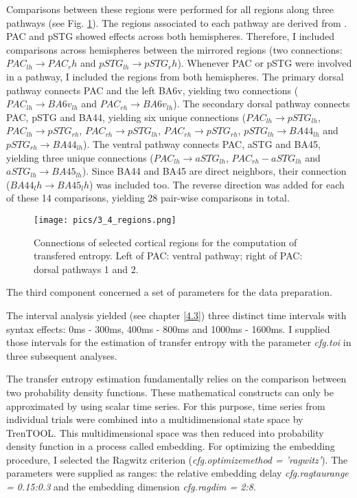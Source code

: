 Comparisons between these regions were performed for all regions along three pathways (see Fig. \ref{3.4.regions}).
The regions associated to each pathway are derived from \cite{1.1.pathways}.
PAC and pSTG showed effects across both hemispheres.
Therefore, I included comparisons across hemispheres between the mirrored regions (two connections: $PAC_{lh} \rightarrow PAC_rh$ and $pSTG_{lh} \rightarrow pSTG_rh$).
Whenever PAC or pSTG were involved in a pathway, I included the regions from both hemispheres.
The primary dorsal pathway connects PAC and the left BA6v, yielding two connections ($PAC_{lh} \rightarrow BA6v_{lh}$ and $PAC_{rh} \rightarrow BA6v_{lh}$).
The secondary dorsal pathway connects PAC, pSTG and BA44, yielding six unique connections ($PAC_{lh} \rightarrow pSTG_{lh}$, $PAC_{lh} \rightarrow pSTG_{rh}$, $PAC_{rh} \rightarrow pSTG_{lh}$, $PAC_{rh} \rightarrow pSTG_{rh}$, $pSTG_{lh} \rightarrow BA44_{lh}$ and $pSTG_{rh} \rightarrow BA44_{lh}$).
The ventral pathway connects PAC, aSTG and BA45, yielding three unique connections ($PAC_{lh} \rightarrow aSTG_{lh}$, $PAC_{rh}-aSTG_{lh}$ and $aSTG_{lh} \rightarrow BA45_{lh}$).
Since BA44 and BA45 are direct neighbors, their connection ($BA44_lh \rightarrow BA45_lh$) was included too.
The reverse direction was added for each of these 14 comparisons, yielding 28 pair-wise comparisons in total.

\begin{figure}[h]
\begin{center}
\vspace{7mm}
\texttt{[image: pics/3\_4\_regions.png]}
\caption{\label{3.4.regions} Connections of selected cortical regions for the computation of transfered entropy. Left of PAC: ventral pathway; right of PAC: dorsal pathways 1 and 2.}
\end{center}
\end{figure}

The third component concerned a set of parameters for the data preparation.

The interval analysis yielded (see chapter \ref{4.3}) three distinct time intervals with syntax effects: 0ms - 300ms, 400ms - 800ms and 1000ms - 1600ms.
I supplied those intervals for the estimation of transfer entropy with the parameter \emph{cfg.toi} in three subsequent analyses.

The transfer entropy estimation fundamentally relies on the comparison between two probability density functions.
These mathematical constructs can only be approximated by using scalar time series.
For this purpose, time series from individual trials were combined into a multidimensional state space by TrenTOOL.
This multidimensional space was then reduced into probability density function in a process called embedding.
For optimizing the embedding procedure, I selected the Ragwitz criterion (\emph{cfg.optimizemethod = 'ragwitz'}).
The parameters were supplied as ranges: the relative embedding delay \emph{cfg.ragtaurange = 0.15:0.3} and the embedding dimension \emph{cfg.ragdim = 2:8}.

